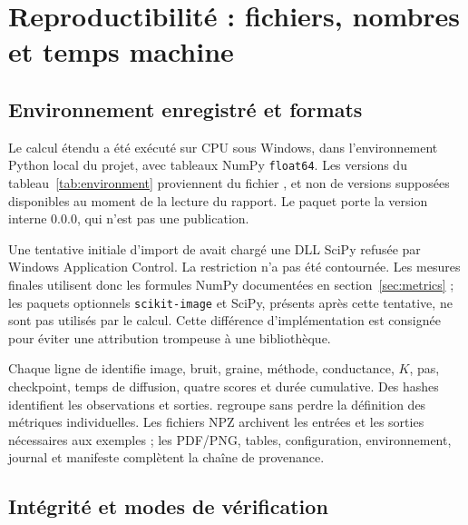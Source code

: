 \section{Reproductibilité : fichiers, nombres et temps machine}
\label{sec:reproducibility}

\subsection{Environnement enregistré et formats}

Le calcul étendu a été exécuté sur CPU sous Windows, dans l'environnement
Python local du projet, avec tableaux NumPy \texttt{float64}. Les versions
du tableau~\ref{tab:environment} proviennent du fichier
, et non de versions supposées disponibles au
moment de la lecture du rapport. Le paquet porte la version interne
$0.0.0$, qui n'est pas une publication.

\begin{table}[htbp]
 \centering
 \caption{Environnement du calcul étendu archivé ; versions enregistrées,
 sans installation ni nouvelle expérience pour la rédaction.}
 \label{tab:environment}
 
\end{table}

Une tentative initiale d'import de  avait chargé
une DLL SciPy refusée par Windows Application Control. La restriction
n'a pas été contournée. Les mesures finales utilisent donc les formules
NumPy documentées en section~\ref{sec:metrics} ; les paquets optionnels
\texttt{scikit-image} et SciPy, présents après cette tentative, ne sont
pas utilisés par le calcul. Cette différence d'implémentation est
consignée pour éviter une attribution trompeuse à une bibliothèque.

Chaque ligne de  identifie image, bruit, graine,
méthode, conductance, $K$, pas, checkpoint, temps de diffusion, quatre
scores et durée cumulative. Des hashes identifient les observations et
sorties.  regroupe sans perdre la définition des
métriques individuelles. Les fichiers NPZ archivent les entrées et les
sorties nécessaires aux exemples ; les PDF/PNG, tables, configuration,
environnement, journal et manifeste complètent la chaîne de provenance.

\subsection{Intégrité et modes de vérification}


